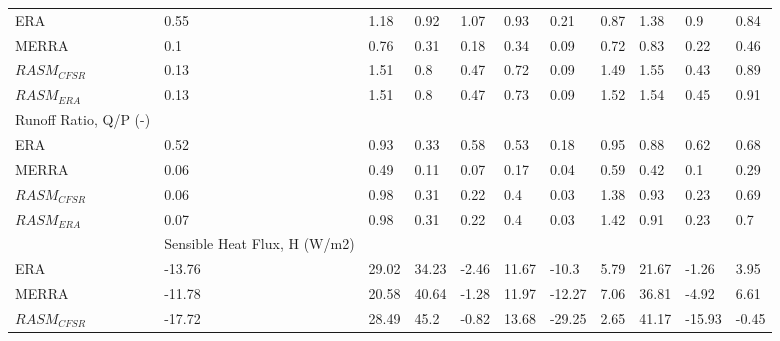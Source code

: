 \begin{table}
{\begin{tabular}{lllllllllll}
ERA                                            & 0.55                         & 1.18   & 0.92   & 1.07   & 0.93   & 0.21   & 0.87   & 1.38   & 0.9    & 0.84   \\
MERRA                                          & 0.1                          & 0.76   & 0.31   & 0.18   & 0.34   & 0.09   & 0.72   & 0.83   & 0.22   & 0.46   \\
$RASM_{CFSR}$                                       & 0.13                         & 1.51   & 0.8    & 0.47   & 0.72   & 0.09   & 1.49   & 1.55   & 0.43   & 0.89   \\
$RASM_{ERA}$                                        & 0.13                         & 1.51   & 0.8    & 0.47   & 0.73   & 0.09   & 1.52   & 1.54   & 0.45   & 0.91   \\
Runoff Ratio, Q/P (-)                          &                              &        &        &        &        &        &        &        &        &        \\
ERA                                            & 0.52                         & 0.93   & 0.33   & 0.58   & 0.53   & 0.18   & 0.95   & 0.88   & 0.62   & 0.68   \\
MERRA                                          & 0.06                         & 0.49   & 0.11   & 0.07   & 0.17   & 0.04   & 0.59   & 0.42   & 0.1    & 0.29   \\
$RASM_{CFSR}$                                       & 0.06                         & 0.98   & 0.31   & 0.22   & 0.4    & 0.03   & 1.38   & 0.93   & 0.23   & 0.69   \\
$RASM_{ERA}$                                        & 0.07                         & 0.98   & 0.31   & 0.22   & 0.4    & 0.03   & 1.42   & 0.91   & 0.23   & 0.7    \\
                                               & Sensible Heat Flux, H (W/m2) &        &        &        &        &        &        &        &        &        \\
ERA                                            & -13.76                       & 29.02  & 34.23  & -2.46  & 11.67  & -10.3  & 5.79   & 21.67  & -1.26  & 3.95   \\
MERRA                                          & -11.78                       & 20.58  & 40.64  & -1.28  & 11.97  & -12.27 & 7.06   & 36.81  & -4.92  & 6.61   \\
$RASM_{CFSR}$                                       & -17.72                       & 28.49  & 45.2   & -0.82  & 13.68  & -29.25 & 2.65   & 41.17  & -15.93 & -0.45  \\

\end{tabular}}
\end{table}
